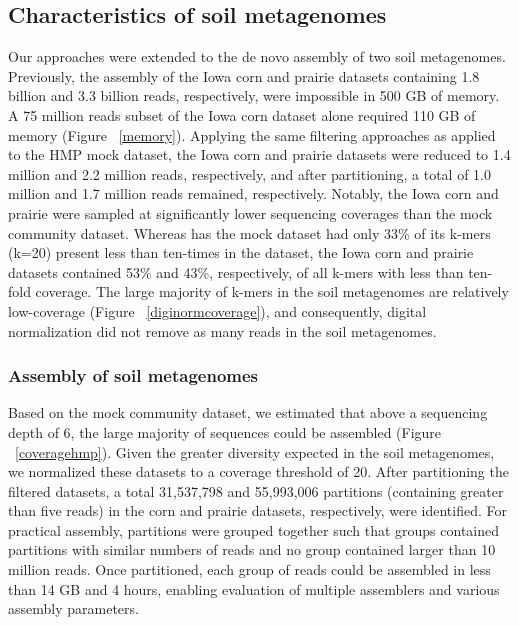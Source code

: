 \documentclass[11pt]{article} %
\begin{document}
\subsection{Characteristics of soil metagenomes}

Our approaches were extended to the de novo assembly of two soil metagenomes.  Previously, the assembly of the Iowa corn and prairie datasets containing 1.8 billion and 3.3 billion reads, respectively, were impossible in 500 GB of memory.   A 75 million reads subset of the Iowa corn dataset alone required 110 GB of memory (Figure ~\ref{memory}).  Applying the same filtering approaches as applied to the HMP mock dataset, the Iowa corn and prairie datasets were reduced to 1.4 million and 2.2 million reads, respectively, and after partitioning, a total of 1.0 million and 1.7 million reads remained, respectively.  Notably, the Iowa corn and prairie were sampled at significantly lower sequencing coverages than the mock community dataset.  Whereas has the mock dataset had only 33\% of its k-mers (k=20) present less than ten-times in the dataset, the Iowa corn and prairie datasets contained 53\% and 43\%, respectively, of all k-mers with less than ten-fold coverage.  The large majority of k-mers in the soil metagenomes are relatively low-coverage (Figure ~\ref{diginormcoverage}), and consequently, digital normalization did not remove as many reads in the soil metagenomes.

\subsubsection{Assembly of soil metagenomes}

Based on the mock community dataset, we estimated that above a sequencing depth of 6, the large majority of sequences could be assembled (Figure ~\ref{coveragehmp}).  Given the greater diversity expected in the soil metagenomes, we normalized these datasets to a coverage threshold of 20.  After partitioning the filtered datasets, a total 31,537,798 and 55,993,006 partitions (containing greater than five reads) in the corn and prairie datasets, respectively, were identified.  For practical assembly, partitions were grouped together such that groups contained partitions with similar numbers of reads and no group contained larger than 10 million reads.  Once partitioned, each group of reads could be assembled in less than 14 GB and 4 hours, enabling evaluation of multiple assemblers and various assembly parameters.
\end{document}

